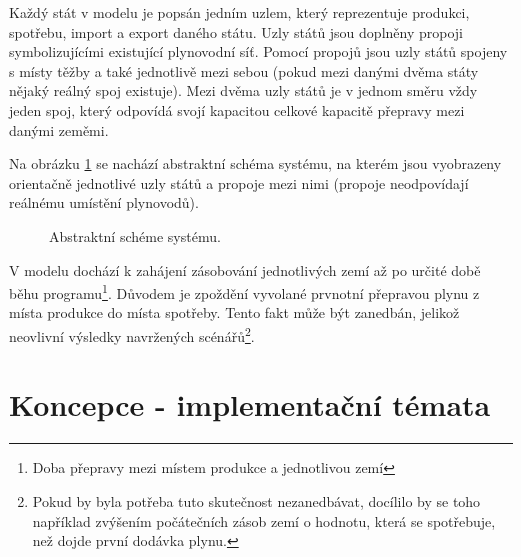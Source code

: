 \documentclass[a4paper,11pt]{article}
\begin{document}
Každý stát v modelu je popsán jedním uzlem, který reprezentuje produkci, spotřebu, import a export daného státu.
Uzly států jsou doplněny propoji symbolizujícími existující plynovodní síť.
Pomocí propojů jsou uzly států spojeny s místy těžby a také jednotlivě mezi sebou
(pokud mezi danými dvěma státy nějaký reálný spoj existuje).
Mezi dvěma uzly států je v jednom směru vždy jeden spoj,
který odpovídá svojí kapacitou celkové kapacitě přepravy mezi danými zeměmi.

Na obrázku \ref{evropa} se nachází abstraktní schéma systému, na kterém jsou vyobrazeny orientačně jednotlivé uzly států
a propoje mezi nimi (propoje neodpovídají reálnému umístění plynovodů).

\begin{figure}[h!]
\begin{center}
\end{center}
\caption{Abstraktní schéme systému.}
\label{evropa}
\end{figure}

V modelu dochází k zahájení zásobování jednotlivých zemí až po určité době běhu
programu\footnote{Doba přepravy mezi místem produkce a jednotlivou zemí}.
Důvodem je zpoždění vyvolané prvnotní přepravou plynu z místa produkce do místa spotřeby.
Tento fakt může být zanedbán, jelikož neovlivní výsledky navržených
scénářů\footnote{Pokud by byla potřeba tuto skutečnost nezanedbávat,
docílilo by se toho například zvýšením počátečních zásob zemí o hodnotu,
která se spotřebuje, než dojde první dodávka plynu.}.

\section{Koncepce - implementační témata}
\end{document}
